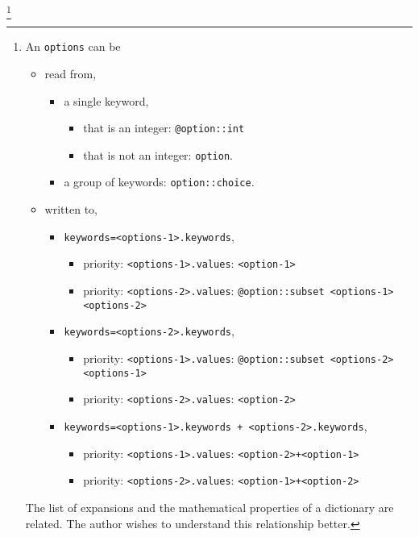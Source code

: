%
\footnote{An \texttt{options} can be
%
\begin{itemize}
    \item{read from,}
        \begin{itemize}
            \item{a single keyword,}
                \begin{itemize}
                    \item{that is an integer: \texttt{@option::int}}
                    \item{that is not an integer: \texttt{option}.}
                \end{itemize}
            \item{a group of keywords: \texttt{option::choice}.}
        \end{itemize}
    \item{written to,}
        \begin{itemize}
            \item{\texttt{keywords=<options-1>.keywords},}
                \begin{itemize}
                    \item{priority: \texttt{<options-1>.values}: \texttt{<option-1>}}
                    \item{priority: \texttt{<options-2>.values}: \texttt{@option::subset <options-1> <options-2>}}
                \end{itemize}
            \item{\texttt{keywords=<options-2>.keywords},}
                \begin{itemize}
                    \item{priority: \texttt{<options-1>.values}: \texttt{@option::subset <options-2> <options-1>}}
                    \item{priority: \texttt{<options-2>.values}: \texttt{<option-2>}}
                \end{itemize}
            \item{\texttt{keywords=<options-1>.keywords + <options-2>.keywords},}
                \begin{itemize}
                    \item{priority: \texttt{<options-1>.values}: \texttt{<option-2>+<option-1>}}
                    \item{priority: \texttt{<options-2>.values}: \texttt{<option-1>+<option-2>}}
            \end{itemize}
        \end{itemize}
\end{itemize}
%
The list of expansions and the mathematical properties of a dictionary are related. The author wishes to understand this relationship better.}
